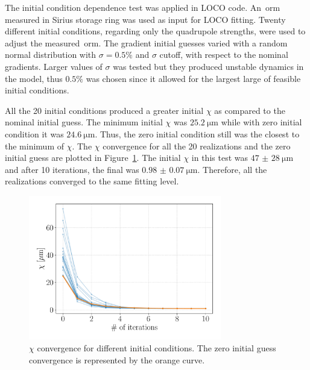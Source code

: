 The initial condition dependence test was applied in LOCO code. An~\gls{orm} measured in Sirius storage ring was used as input for LOCO fitting. Twenty different initial conditions, regarding only the quadrupole strengths, were used to adjust the measured~\gls{orm}. The gradient initial guesses varied with a random normal distribution with $\sigma=0.5\%$ and $\sigma$ cutoff, with respect to the nominal gradients. Larger values of $\sigma$ was tested but they produced unstable dynamics in the model, thus $0.5\%$ was chosen since it allowed for the largest large of feasible initial conditions.

All the 20 initial conditions produced a greater initial $\chi$ as compared to the nominal initial guess. The minimum initial $\chi$ was $\SI{25.2}{\micro\meter}$ while with zero initial condition it was $\SI{24.6}{\micro\meter}$. Thus, the zero initial condition still was the closest to the minimum of $\chi$. The $\chi$ convergence for all the 20 realizations and the zero initial guess are plotted in Figure~\ref{fig:chi_ini_guess}. The initial $\chi$ in this test was $\SI{47(28)}{\micro\meter}$ and after 10 iterations, the final was $\SI{0.98(7)}{\micro\meter}$. Therefore, all the realizations converged to the same fitting level.
\begin{figure}[h!]
\centering
\includegraphics[width=0.75\textwidth]{figures/chi_convergence_initial_guess.pdf}
\caption{$\chi$ convergence for different initial conditions. The zero initial guess convergence is represented by the orange curve.}
\label{fig:chi_ini_guess}
\end{figure}

